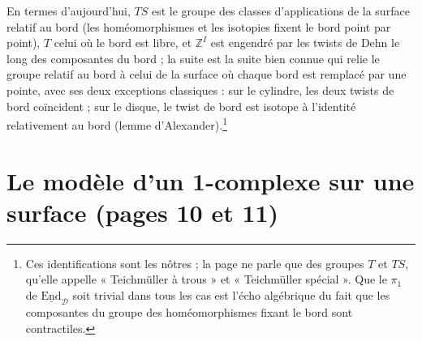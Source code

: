 \documentclass[11pt,a4paper]{article}
\begin{document}
En termes d'aujourd'hui, $TS$ est le groupe des classes d'applications de la
surface relatif au bord (les homéomorphismes et les isotopies fixent le bord
point par point), $T$ celui où le bord est libre, et $\mathbb{Z}^I$ est
engendré par les twists de Dehn le long des composantes du bord ; la suite
est la suite bien connue qui relie le groupe relatif au bord à celui de la
surface où chaque bord est remplacé par une pointe, avec ses deux exceptions
classiques : sur le cylindre, les deux twists de bord coïncident ; sur le
disque, le twist de bord est isotope à l'identité relativement au bord
(lemme d'Alexander).\footnote{Ces identifications sont les nôtres ; la page
ne parle que des groupes $T$ et $TS$, qu'elle appelle « Teichmüller à trous »
et « Teichmüller spécial ». Que le $\pi_1$ de
$\underline{\mathrm{End}}_{\mathcal{D}}$ soit trivial dans tous les cas est
l'écho algébrique du fait que les composantes du groupe des homéomorphismes
fixant le bord sont contractiles.}

\section*{Le modèle d'un 1-complexe sur une surface (pages 10 et 11)}
\end{document}
